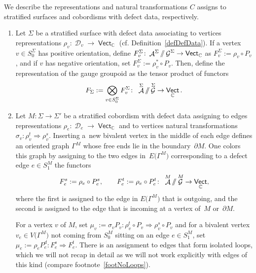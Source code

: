 \documentclass[10pt,a4paper]{amsart}
\DeclareMathOperator{\vect}{\mathsf{Vect}}
\DeclareMathOperator{\C}{\mathbb{C}}
\DeclareMathOperator{\cala}{\mathcal{A}}
\DeclareMathOperator{\cald}{\mathcal{D}}
\DeclareMathOperator{\calg}{\mathcal{G}}
\newcommand{\sslash}{\mathbin{/\mkern-6mu/}}
\numberwithin{equation}{section}
\theoremstyle{definition}
\begin{document}
We describe the representations and natural transformations $C$ assigns to stratified surfaces and cobordisms with defect data, respectively.
\begin{enumerate}\itemsep=0pt
 \item Let $\Sigma$ be a stratified surface with defect data associating to vertices representations $\rho_v\colon \cald_v \rightarrow \vect_{\C}$ (cf. Definition~\ref{defDefData}). If a vertex $v \in S_0^{\Sigma}$ has positive orientation, define $F_v^{\Sigma}\colon \cala^{\Sigma} \sslash \calg^{\Sigma} \rightarrow \vect_{\C}$ as $F_v^{\Sigma} := \rho_v \circ P_v$, and if $v$ has negative orientation, set $F_v^{\Sigma} := \rho_v^* \circ P_v$. Then, define the representation of the gauge groupoid as the tensor product of functors
 \begin{align}
 \label{eqGGRep}
 F_{\Sigma}:= \bigotimes_{v \in S_0^{\Sigma}} F_v^{\Sigma}\colon \ \cala^{\Sigma} \sslash \calg^{\Sigma} \rightarrow \vect_{\C}.
 \end{align}
 \item Let $M\colon \Sigma \rightarrow \Sigma'$ be a stratified cobordism with defect data assigning to edges representations $\rho_e\colon \cald_e \rightarrow \vect_{\C}$ and to vertices natural transformations $\sigma_v\colon \rho_v^t \Rightarrow \rho_v^s$. Inserting a~new bivalent vertex in the middle of each edge defines an oriented graph $\Gamma^M$ whose free ends lie in the boundary~$\partial M$. One colors this graph by assigning to the two edges in~$E\bigl(\Gamma^M\bigr)$ corresponding to a defect edge $e \in S_1^M$ the functors
 \begin{align*}
 F_e^s := \rho_e \circ P_e^s, \qquad F_e^t := \rho_e \circ P_e^t\colon \ \cala^M \sslash \calg^M \rightarrow \vect_{\C},
 \end{align*}
 where the first is assigned to the edge in $E\bigl(\Gamma^M\bigr)$ that is outgoing, and the second is assigned to the edge that is incoming at a vertex of~$M$ or~$\partial M$.

 For a vertex $v$ of $M$, set $\mu_v := \sigma_v P_v\colon \rho_v^t \circ P_v \Rightarrow \rho_v^s \circ P_v$ and for a bivalent vertex $v_e \in V\bigl(\Gamma^M\bigr)$ not coming from $S_0^M$ sitting on an edge $e \in S_1^M$, set $\mu_e:= \rho_eP_e^d\colon F_e^s \Rightarrow F_e^t$. There is an assignment to edges that form isolated loops, which we will not recap in detail as we will not work explicitly with edges of this kind (compare footnote~\ref{footNoLoops}).


\end{enumerate}
\end{document}
